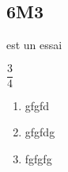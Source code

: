 \subsection*{6M3}


 est un essai

$\dfrac{3}{4}$

\begin{enumerate}
	\item gfgfd
	\item gfgfdg
	\item fgfgfg
\end{enumerate}
